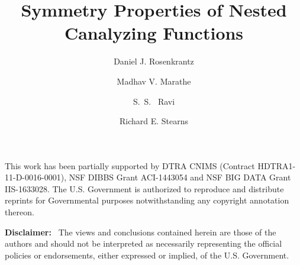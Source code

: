 \documentclass[
submission
]{dmtcs-episciences}
\author{Daniel J. Rosenkrantz\affiliationmark{1}
  \and Madhav V. Marathe\affiliationmark{2}%
  \and S.~S.~ Ravi\affiliationmark{1}%
  \and Richard E. Stearns\affiliationmark{1}
}
\title[Symmetry and NCFs]
      {Symmetry Properties of Nested Canalyzing Functions}
\affiliation{
  Biocomplexity Institute and Initiative, University of Virginia and
  Department of Computer Science, University at Albany 
  -- State University of New York, USA\\
  Biocomplexity Institute and Initiative \& Department of 
  Computer Science, University of Virginia, USA
}
\begin{document}
\maketitle




\newcommand{\QED}{\hfill\rule{2mm}{2mm}}

\newcommand{\cpoly}{\textbf{P}}
\newcommand{\cnp}{\textbf{NP}}
\newcommand{\cnump}{\textbf{\#P}}
\newcommand{\wtg}{\mbox{$\mathcal{G}$}}

\newcommand{\arr}{\mbox{$\:\longrightarrow\:$}}

\smallskip

\begin{abstract}

\end{abstract}






\acknowledgments
This work has been partially supported by
DTRA CNIMS (Contract HDTRA1-11-D-0016-0001),
NSF DIBBS Grant ACI-1443054 and
NSF BIG DATA Grant IIS-1633028.
The U.S. Government is authorized to reproduce and
distribute reprints for Governmental purposes notwithstanding
any copyright annotation thereon.

\bigskip%

\medskip

\noindent
\textbf{Disclaimer:}~ The views and conclusions contained
herein are those of the authors and should
not be interpreted as necessarily representing the
official policies or endorsements, either expressed
or implied, of the U.S. Government.



%

\end{document}
